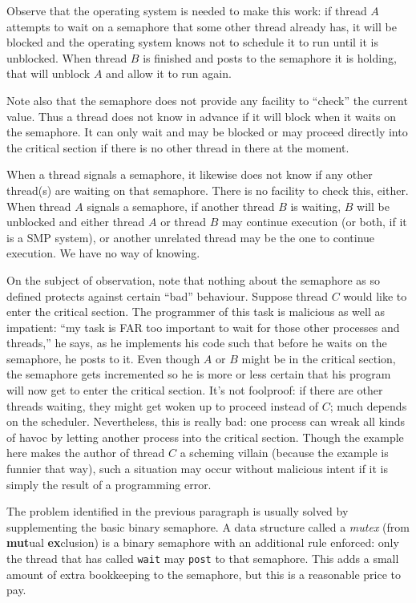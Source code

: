 \documentclass[a4paper]{report}
\begin{document}
Observe that the operating system is needed to make this work: if thread $A$ attempts to wait on a semaphore that some other thread already has, it will be blocked and the operating system knows not to schedule it to run until it is unblocked. When thread $B$ is finished and posts to the semaphore it is holding, that will unblock $A$ and allow it to run again.

Note also that the semaphore does not provide any facility to ``check'' the current value. Thus a thread does not know in advance if it will block when it waits on the semaphore. It can only wait and may be blocked or may proceed directly into the critical section if there is no other thread in there at the moment.

When a thread signals a semaphore, it likewise does not know if any other thread(s) are waiting on that semaphore. There is no facility to check this, either. When thread $A$ signals a semaphore, if another thread $B$ is waiting, $B$ will be unblocked and either thread $A$ or thread $B$ may continue execution (or both, if it is a SMP system), or another unrelated thread may be the one to continue execution. We have no way of knowing.

On the subject of observation, note that nothing about the semaphore as so defined protects against certain ``bad'' behaviour. Suppose thread $C$ would like to enter the critical section. The programmer of this task is malicious as well as impatient: ``my task is FAR too important to wait for those other processes and threads,'' he says, as he implements his code such that before he waits on the semaphore, he posts to it. Even though $A$ or $B$ might be in the critical section, the semaphore gets incremented so he is more or less certain that his program will now get to enter the critical section. It's not foolproof: if there are other threads waiting, they might get woken up to proceed instead of $C$; much depends on the scheduler. Nevertheless, this is really bad: one process can wreak all kinds of havoc by letting another process into the critical section. Though the example here makes the author of thread $C$ a scheming villain (because the example is funnier that way), such a situation may occur without malicious intent if it is simply the result of a programming error.

The problem identified in the previous paragraph is usually solved by supplementing the basic binary semaphore. A data structure called a \textit{mutex} (from \textbf{mut}ual \textbf{ex}clusion) is a binary semaphore with an additional rule enforced: only the thread that has called \texttt{wait} may \texttt{post} to that semaphore. This adds a small amount of extra bookkeeping to the semaphore, but this is a reasonable price to pay.
\end{document}
